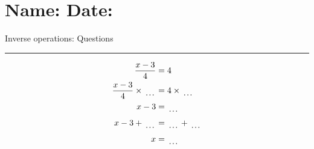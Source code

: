 \documentclass[12pt]{article}
\def \HeadingQuestions {\section*{\Large Name: \underline{\hspace{8cm}} \hfill Date: \underline{\hspace{3cm}}} \vspace{-3mm}
{Inverse operations: Questions} \vspace{1pt}\hrule}
\newcounter{minipagecount}
\begin{document}
\HeadingQuestions
\vspace{1mm}
\begin{multicols}{2}
\noindent{(\theminipagecount)}\hspace{0.1mm} %
\begin{minipage}[t]{0.45\textwidth} %
    \vspace{-26pt}  %
    \raggedright %
    \begin{align*} %
        \frac{x - 3}{4} &= 4\\
        \frac{x - 3}{4} \times\dotuline{\hspace{5mm}} &= 4 \times\dotuline{\hspace{5mm}}\\
        x - 3 &= \dotuline{\hspace{5mm}}\\
        x - 3 + \dotuline{\hspace{5mm}} &= \dotuline{\hspace{5mm}} + \dotuline{\hspace{5mm}}\\
        x &= \dotuline{\hspace{5mm}}\\
    \end{align*}
\end{minipage} %
\noindent{(\theminipagecount)}\hspace{0.1mm} %
\begin{minipage}[t]{0.45\textwidth} %
    \vspace{-26pt}  %

\end{minipage}
\end{multicols}
\end{document}
